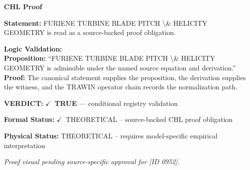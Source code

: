 \vspace{0.45em}
\noindent\textbf{CHL Proof}\par
\textbf{Statement:} FURIENE TURBINE BLADE PITCH \textbackslash{}\& HELICITY GEOMETRY is read as a source-backed proof obligation.

\textbf{Logic Validation:}\\
\textbf{Proposition:} ``FURIENE TURBINE BLADE PITCH \textbackslash{}\& HELICITY GEOMETRY is admissible under the named source equation and derivation.''\\
\textbf{Proof:} The canonical statement supplies the proposition, the derivation supplies the witness, and the TRAWIN operator chain records the normalization path.

\textbf{VERDICT:} \ensuremath{\checkmark}\ \textbf{TRUE} --- conditional registry validation

\textbf{Formal Status:} \ensuremath{\checkmark}\ THEORETICAL -- source-backed CHL proof obligation

\textbf{Physical Status:} THEORETICAL -- requires model-specific empirical interpretation
\par\vspace{0.45em}
\par
\vfill
\begingroup\footnotesize\itshape
Proof visual pending source-specific approval for [ID 0952].
\par\endgroup
\vfill
\endgroup
\endgroup
